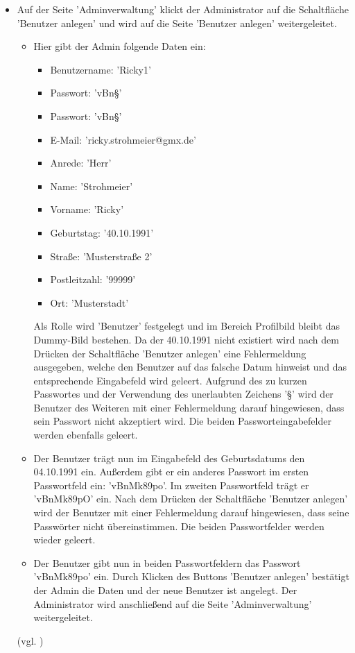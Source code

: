 \documentclass[a4paper]{scrreprt}
\begin{document}
\begin{itemize}
				\item {} 
				 Auf der Seite 'Adminverwaltung' klickt der Administrator auf die Schaltfläche 'Benutzer anlegen' und wird auf die Seite 'Benutzer anlegen' weitergeleitet. 
					 \begin{itemize}
					 \item Hier gibt der Admin folgende Daten ein:
						\begin{itemize}
							\item Benutzername: 'Ricky1' 
							\item Passwort: 'vBn§'
							\item Passwort: 'vBn§'
							\item E-Mail: 'ricky.strohmeier@gmx.de'
							\item Anrede: 'Herr'
							\item Name: 'Strohmeier'
							\item Vorname: 'Ricky'
							\item Geburtstag: '40.10.1991'
							\item Straße: 'Musterstraße 2'
							\item Postleitzahl: '99999'
							\item Ort: 'Musterstadt'
						\end{itemize}
					 Als Rolle wird 'Benutzer' festgelegt und im Bereich Profilbild bleibt das Dummy-Bild bestehen. Da der 40.10.1991 nicht existiert wird nach dem Drücken der Schaltfläche 'Benutzer anlegen' eine Fehlermeldung ausgegeben, welche den Benutzer auf das falsche Datum hinweist und das entsprechende Eingabefeld wird geleert. Aufgrund des zu kurzen Passwortes und der Verwendung des unerlaubten Zeichens '§' wird der Benutzer des Weiteren mit einer Fehlermeldung darauf hingewiesen, dass sein Passwort nicht akzeptiert wird. Die beiden Passworteingabefelder werden ebenfalls geleert.
					 
					 \item Der Benutzer trägt nun im Eingabefeld des Geburtsdatums den 04.10.1991 ein. Außerdem gibt er ein anderes Passwort im ersten Passwortfeld ein: 'vBnMk89po'. Im zweiten Passwortfeld trägt er 'vBnMk89pO' ein. Nach dem Drücken der Schaltfläche 'Benutzer anlegen' wird der Benutzer mit einer Fehlermeldung darauf hingewiesen, dass seine Passwörter nicht übereinstimmen. Die beiden Passwortfelder werden wieder geleert.
					 
					 \item Der Benutzer gibt nun in beiden Passwortfeldern das Passwort 'vBnMk89po' ein. Durch Klicken des Buttons 'Benutzer anlegen' bestätigt der Admin die Daten und der neue Benutzer ist angelegt. Der Administrator wird anschließend auf die Seite 'Adminverwaltung' weitergeleitet.
					\end{itemize}
				(vgl. )
					

\end{itemize}
\end{document}
